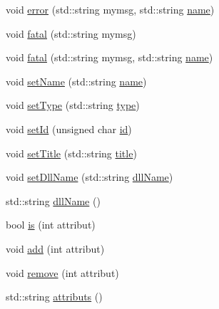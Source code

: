\begin{DoxyCompactItemize}
void \hyperlink{classObject_ad7f6c457733082efa2f9ff5f5c8e119a}{error} (std\+::string mymsg, std\+::string \hyperlink{classObject_a300f4c05dd468c7bb8b3c968868443c1}{name})
\item 
void \hyperlink{classObject_aad5a16aac7516ce65bd5ec02ab07fc80}{fatal} (std\+::string mymsg)
\item 
void \hyperlink{classObject_ae62acd3d09f716220f75f252dc38bc9a}{fatal} (std\+::string mymsg, std\+::string \hyperlink{classObject_a300f4c05dd468c7bb8b3c968868443c1}{name})
\item 
void \hyperlink{classObject_ae30fea75683c2d149b6b6d17c09ecd0c}{set\+Name} (std\+::string \hyperlink{classObject_a300f4c05dd468c7bb8b3c968868443c1}{name})
\item 
void \hyperlink{classObject_aae534cc9d982bcb9b99fd505f2e103a5}{set\+Type} (std\+::string \hyperlink{classObject_a84f99f70f144a83e1582d1d0f84e4e62}{type})
\item 
void \hyperlink{classObject_a398fe08cba594a0ce6891d59fe4f159f}{set\+Id} (unsigned char \hyperlink{classObject_af99145335cc61ff6e2798ea17db009d2}{id})
\item 
void \hyperlink{classObject_a89557dbbad5bcaa02652f5d7fa35d20f}{set\+Title} (std\+::string \hyperlink{classObject_a73a0f1a41828fdd8303dd662446fb6c3}{title})
\item 
void \hyperlink{classObject_a870c5af919958c2136623b2d7816d123}{set\+Dll\+Name} (std\+::string \hyperlink{classObject_a2e3947f2870094c332d7454117f3ec63}{dll\+Name})
\item 
std\+::string \hyperlink{classObject_a2e3947f2870094c332d7454117f3ec63}{dll\+Name} ()
\item 
bool \hyperlink{classAttrib_a704f26af560909ad22065083bb7d4c34}{is} (int attribut)
\item 
void \hyperlink{classAttrib_a235f773af19c900264a190b00a3b4ad7}{add} (int attribut)
\item 
void \hyperlink{classAttrib_a7d4ef7e32d93cb287792b87b857e79f3}{remove} (int attribut)
\item 
std\+::string \hyperlink{classAttrib_aee7bbf16b144887f196e1341b24f8a26}{attributs} ()
\end{DoxyCompactItemize}
